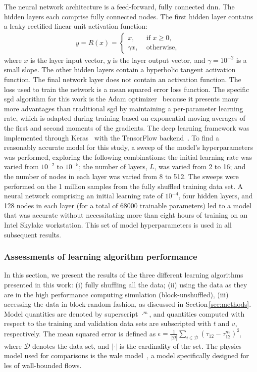 \documentclass[review]{elsarticle}
\begin{document}
The neural network architecture is a feed-forward, fully connected
\gls{dnn}. The hidden layers each comprise fully connected
nodes. The first hidden layer contains a leaky rectified linear unit
activation function:
\begin{align}
  \label{eq:relu}
  y = R(x) =
  \begin{cases}
    x, & \text{ if } x \geq 0, \\
    \gamma x, & \text{ otherwise, }
  \end{cases}
\end{align}
where $x$ is the layer input vector, $y$ is the layer output vector,
and $\gamma=10^{-2}$ is a small slope. The other hidden layers contain
a hyperbolic tangent activation function. The final network layer does
not contain an activation function. The loss used to train the network
is a mean squared error loss function. The specific \gls{sgd} algorithm for this work is the Adam
optimizer~\cite{Kingma2014} because it presents many more advantages
than traditional \gls{sgd} by maintaining a
per-parameter learning rate, which is adapted during training based on
exponential moving averages of the first and second moments of the
gradients. The deep learning framework was implemented through
Keras~\cite{Chollet2015} with the TensorFlow
backend~\cite{tensorflow2015-whitepaper}. To find a reasonably
accurate model for this study, a sweep of the model's hyperparameters
was performed, exploring the following combinations: the initial
learning rate was varied from $10^{-2}$ to $10^{-5}$; the number of
layers, $L$, was varied from 2 to 16; and the number of nodes in
each layer was varied from 8 to 512. The sweeps were performed on the
1 million samples from the fully shuffled training data set. A
neural network comprising an initial learning rate of $10^{-4}$,
four hidden layers, and 128 nodes in each layer (for a total of 68000
trainable parameters) led to a model that was accurate without
necessitating more than eight hours of training on an Intel Skylake
workstation. This set of model hyperparameters is used in all
subsequent results.

\subsubsection{Assessments of learning algorithm performance}

In this section, we present the results of the three different
learning algorithms presented in this work: (i) fully shuffling all
the data; (ii) using the data as they are in the high performance
computing simulation (block-unshuffled), (iii) accessing the data in
block-random fashion, as discussed in Section\,\ref{sec:methods}. Model
quantities are denoted by superscript $\cdot^m$, and quantities
computed with respect to the training and validation data sets are
subscripted with $t$ and $v$, respectively. The mean squared error is defined as
$\epsilon = \frac{1}{|\mathcal{D}|} \sum_{i\in \mathcal{D}} (\tau_{12}
- \tau_{12}^m)^2$, where $\mathcal{D}$ denotes the data set, and
$|\cdot|$ is the cardinality of the set. The physics model used for
comparisons is the \gls{wale} model~\cite{Ducros1998}, a model
specifically designed for \gls{les} of wall-bounded flows.
\end{document}
